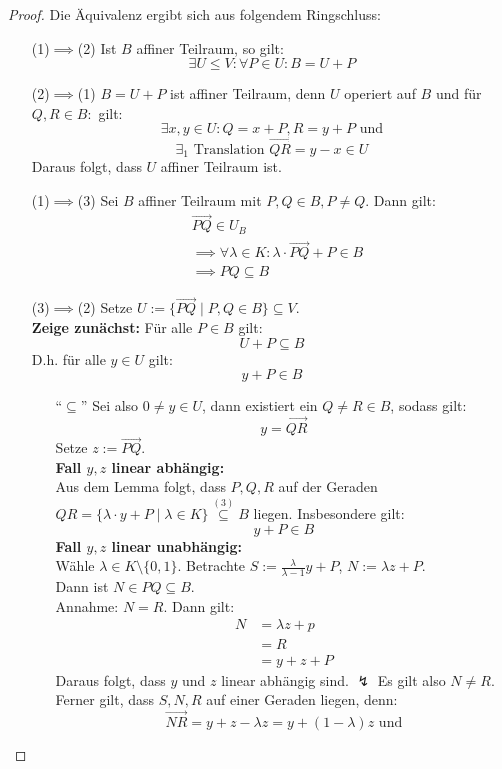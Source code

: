 \documentclass[parskip,a4paper,twoside,DIV15,BCOR12mm]{scrbook}
\begin{document}
\begin{proof}
Die Äquivalenz ergibt sich aus folgendem Ringschluss:
\begin{itemize}
\item[(1)$\implies$(2)] Ist $B$ affiner Teilraum, so gilt:
\[\exists U\le V:\forall P\in U:B=U+P\]
\item[(2)$\implies$(1)] $B=U+P$ ist affiner Teilraum, denn $U$ operiert auf $B$
und für $Q,R\in B:$ gilt:
\[\exists x,y\in U: Q=x+P,R=y+P \text{ und}\] 
\[\exists_1 \text{ Translation } \overrightarrow{QR}=y-x\in U\]
Daraus folgt, dass $U$ affiner Teilraum ist.
\item[(1)$\implies$(3)] Sei $B$ affiner Teilraum mit $P,Q\in B, P\ne Q$. Dann gilt:
\begin{align*}
&\overrightarrow{PQ}\in U_B\\
&\implies\forall \lambda\in K:\lambda\cdot\overrightarrow{PQ}+P\in B\\
&\implies PQ\subseteq B
\end{align*}
\item[(3)$\implies$(2)] Setze $U:=\{\overrightarrow{PQ}\mid P,Q\in B\}\subseteq V$.\\
\textbf{Zeige zunächst:} Für alle $P\in B$ gilt:
\[U+P\subseteq B\] 
D.h. für alle $y\in U$ gilt:
\[y+P\in B\]
\begin{enumerate}
\item["`$\subseteq$"'] Sei also $0\ne y\in U$, dann existiert ein $Q\ne R\in B$, sodass gilt: 
\[ y=\overrightarrow{QR}\] 
Setze $z:=\overrightarrow{PQ}$.\\
\textbf{Fall $y,z$ linear abhängig:}\\
Aus dem Lemma folgt, dass $P,Q,R$ auf der Geraden $QR=\{\lambda\cdot y+P\mid \lambda\in K\}
\stackrel{(3)}{\subseteq} B$ liegen. Insbesondere gilt: 
\[y+P\in B\]
\textbf{Fall $y,z$ linear unabhängig:}\\
Wähle $\lambda\in K\setminus\{0,1\}$. Betrachte $S:=\frac{\lambda}{\lambda-1}y+P$, 
$N:=\lambda z+P$.\\
Dann ist $N\in PQ\subseteq B$.\\
Annahme: $N=R$.
Dann gilt:
\begin{align*}
N&=\lambda z+p\\
&=R\\
&=y+z+P
\end{align*}
Daraus folgt, dass $y$ und $z$ linear abhängig sind. $\lightning$
Es gilt also $N\ne R$. Ferner gilt, dass $S,N,R$ auf einer Geraden liegen, denn:
\[\overrightarrow{NR} = y+z-\lambda z = y+(1-\lambda)z \text{ und}\]

\end{enumerate}
\end{itemize}
\end{proof}
\end{document}
